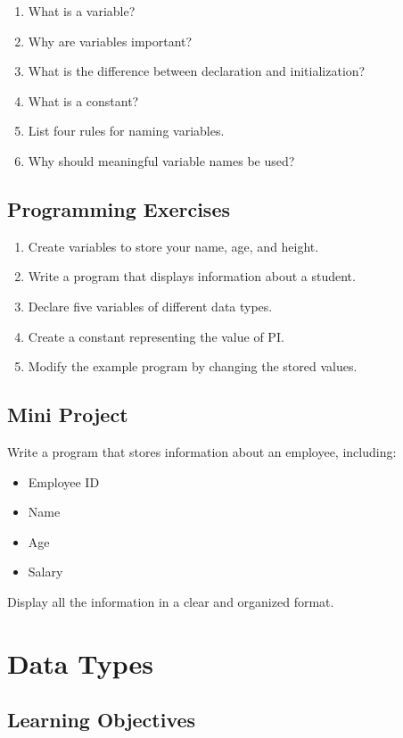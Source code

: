 \documentclass[12pt,openany]{book}
\begin{document}
\begin{enumerate}
    \item What is a variable?
    \item Why are variables important?
    \item What is the difference between declaration and initialization?
    \item What is a constant?
    \item List four rules for naming variables.
    \item Why should meaningful variable names be used?
\end{enumerate}

\section{Programming Exercises}

\begin{enumerate}
    \item Create variables to store your name, age, and height.
    \item Write a program that displays information about a student.
    \item Declare five variables of different data types.
    \item Create a constant representing the value of PI.
    \item Modify the example program by changing the stored values.
\end{enumerate}

\section{Mini Project}

Write a program that stores information about an employee, including:

\begin{itemize}
    \item Employee ID
    \item Name
    \item Age
    \item Salary
\end{itemize}

Display all the information in a clear and organized format.
\chapter{Data Types}

\section{Learning Objectives}
\end{document}
